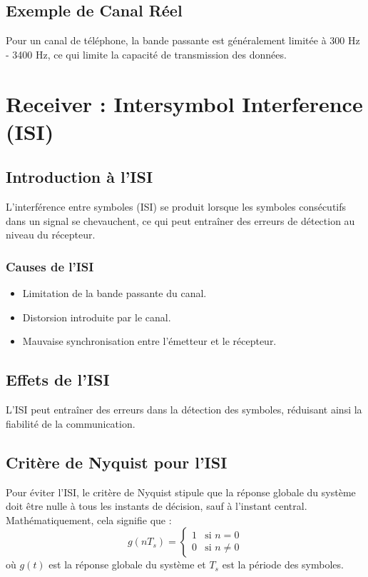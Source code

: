 \documentclass[10pt,a4paper]{article}
\begin{document}
\subsection*{Exemple de Canal Réel}
Pour un canal de téléphone, la bande passante est généralement limitée à 300 Hz - 3400 Hz, ce qui limite la capacité de transmission des données.

\section*{Receiver : Intersymbol Interference (ISI)}

\subsection*{Introduction à l'ISI}
L'interférence entre symboles (ISI) se produit lorsque les symboles consécutifs dans un signal se chevauchent, ce qui peut entraîner des erreurs de détection au niveau du récepteur.

\subsubsection*{Causes de l'ISI}
\begin{itemize}
    \item Limitation de la bande passante du canal.
    \item Distorsion introduite par le canal.
    \item Mauvaise synchronisation entre l'émetteur et le récepteur.
\end{itemize}

\subsection*{Effets de l'ISI}
L'ISI peut entraîner des erreurs dans la détection des symboles, réduisant ainsi la fiabilité de la communication.

\subsection*{Critère de Nyquist pour l'ISI}
Pour éviter l'ISI, le critère de Nyquist stipule que la réponse globale du système doit être nulle à tous les instants de décision, sauf à l'instant central. Mathématiquement, cela signifie que :
\[ g(nT_s) =
  \begin{cases}
   1 & \text{si } n = 0 \\
   0 & \text{si } n \neq 0
  \end{cases}
\]
où \( g(t) \) est la réponse globale du système et \( T_s \) est la période des symboles.
\end{document}
